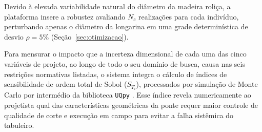 Devido à elevada variabilidade natural do diâmetro da madeira roliça, a plataforma insere a robustez avaliando $N_c$ realizações para cada indivíduo, perturbando apenas o diâmetro da longarina em uma grade determinística de desvio $\rho = 5\%$ (Seção~\ref{sec:otimizacao}).

Para mensurar o impacto que a incerteza dimensional de cada uma das cinco variáveis de projeto, ao longo de todo o seu domínio de busca, causa nas seis restrições normativas listadas, o sistema integra o cálculo de índices de sensibilidade de ordem total de Sobol ($S_{T_i}$), processados por simulação de Monte Carlo por intermédio da biblioteca \texttt{UQpy} \parencite{Olivier2020}.
Esse índice revela numericamente ao projetista qual das características geométricas da ponte requer maior controle de qualidade de corte e execução em campo para evitar a falha sistêmica do tabuleiro.



